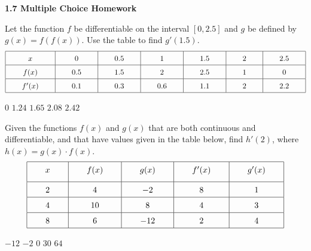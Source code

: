 \textbf{\large{1.7 Multiple Choice Homework}} \par

\begin{questions}
    \question Let the function $f$ be differentiable on the interval $[0, 2.5]$ and $g$ be defined by $g(x) = f(f(x))$. Use the table to find $g'(1.5)$. \begin{align*}
        \arraycolsep=22pt\def\arraystretch{1.5}
        \begin{array}{|c|c|c|c|c|c|c|}
            \hline
            x & 0 & 0.5 & 1 & 1.5 & 2 & 2.5 \\ \hline
            f(x) & 0.5 & 1.5 & 2 & 2.5 & 1 & 0 \\ \hline
            f'(x) & 0.1 & 0.3 & 0.6 & 1.1 & 2 & 2.2 \\
            \hline
        \end{array}
    \end{align*}

    \begin{oneparchoices}
        \choice $0$
        \choice $1.24$
        \choice $1.65$
        \choice $2.08$
        \choice $2.42$
    \end{oneparchoices} \par \horizontalline

    \question Given the functions $f(x)$ and $g(x)$ that are both continuous and differentiable, and that have values given in the table below, find $h'(2)$, where $h(x) = g(x) \cdot f(x)$.  \begin{align*}
        \arraycolsep=22pt\def\arraystretch{1.5}
        \begin{array}{|c|c|c|c|c|}
            \hline
            x & f(x) & g(x) & f'(x) & g'(x) \\[5.5pt] \hline
            2 & 4 & -2 & 8 & 1 \\ \hline
            4 & 10 & 8 & 4 & 3 \\ \hline
            8 & 6 & -12 & 2 & 4 \\
            \hline
        \end{array}
    \end{align*}

    \begin{oneparchoices}
        \choice $-12$
        \choice $-2$
        \choice $0$
        \choice $30$
        \choice $64$
    \end{oneparchoices} \par \horizontalline


\end{questions}
